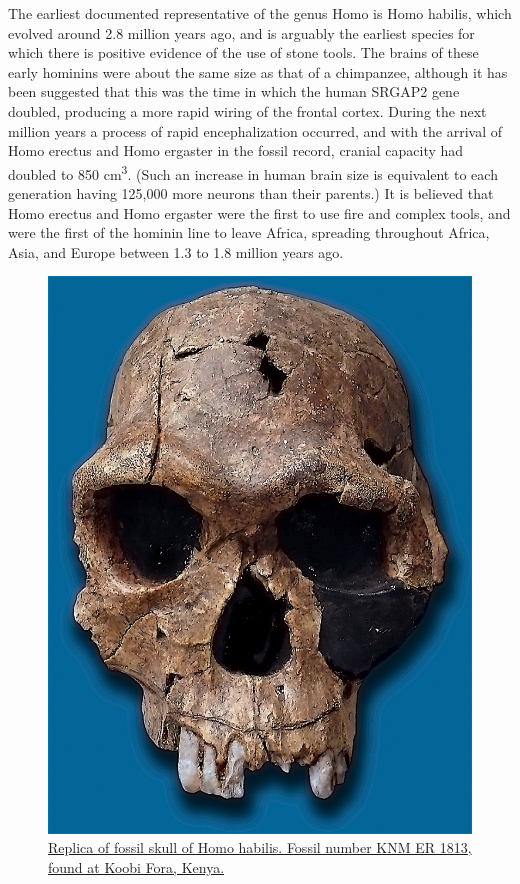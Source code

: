 The earliest documented representative of the genus Homo is Homo habilis, which evolved around 2.8 million years ago, and is arguably the earliest species for which there is positive evidence of the use of stone tools. The brains of these early hominins were about the same size as that of a chimpanzee, although it has been suggested that this was the time in which the human SRGAP2 gene doubled, producing a more rapid wiring of the frontal cortex. During the next million years a process of rapid encephalization occurred, and with the arrival of Homo erectus and Homo ergaster in the fossil record, cranial capacity had doubled to 850 cm\textsuperscript{3}. (Such an increase in human brain size is equivalent to each generation having 125,000 more neurons than their parents.) It is believed that Homo erectus and Homo ergaster were the first to use fire and complex tools, and were the first of the hominin line to leave Africa, spreading throughout Africa, Asia, and Europe between 1.3 to 1.8 million years ago.



\begin{figure}

{\centering \includegraphics[width=0.7\linewidth]{./figures/animals/Homo_habilis-KNM_ER_1813} 

}

\caption{\href{https://commons.wikimedia.org/wiki/File:Homo_habilis-KNM_ER_1813.jpg}{Replica of fossil skull of Homo habilis. Fossil number KNM ER 1813, found at Koobi Fora, Kenya.}}\label{fig:homohabilis}
\end{figure}

